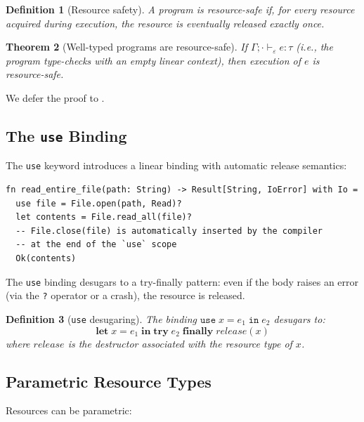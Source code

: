 \documentclass[11pt]{article}
\newtheorem{theorem}{Theorem}[section]
\newtheorem{definition}[theorem]{Definition}
\begin{document}
\begin{definition}[Resource safety]\label{def:resource-safety}
A program is \emph{resource-safe} if, for every resource acquired
during execution, the resource is eventually released exactly once.
\end{definition}

\begin{theorem}[Well-typed programs are resource-safe]\label{thm:resource-safety}
If $\Gamma; \cdot \vdash_\varepsilon e : \tau$ (i.e., the program
type-checks with an empty linear context), then execution of $e$
is resource-safe.
\end{theorem}

We defer the proof to .

\subsection{The \texttt{use} Binding}\label{sec:use-binding}

The \texttt{use} keyword introduces a linear binding with
automatic release semantics:

\begin{lstlisting}[caption={The \texttt{use} binding},label={lst:use-binding}]
fn read_entire_file(path: String) -> Result[String, IoError] with Io =
  use file = File.open(path, Read)?
  let contents = File.read_all(file)?
  -- File.close(file) is automatically inserted by the compiler
  -- at the end of the `use` scope
  Ok(contents)
\end{lstlisting}

The \texttt{use} binding desugars to a try-finally pattern: even if
the body raises an error (via the \texttt{?} operator or a crash),
the resource is released.

\begin{definition}[\texttt{use} desugaring]\label{def:use-desugar}
The binding $\texttt{use}\; x = e_1\; \texttt{in}\; e_2$ desugars to:
\[
  \mathbf{let}\; x = e_1\; \mathbf{in}\;
  \mathbf{try}\; e_2\; \mathbf{finally}\; \mathit{release}(x)
\]
where $\mathit{release}$ is the destructor associated with the resource
type of $x$.
\end{definition}

\subsection{Parametric Resource Types}

Resources can be parametric:
\end{document}

